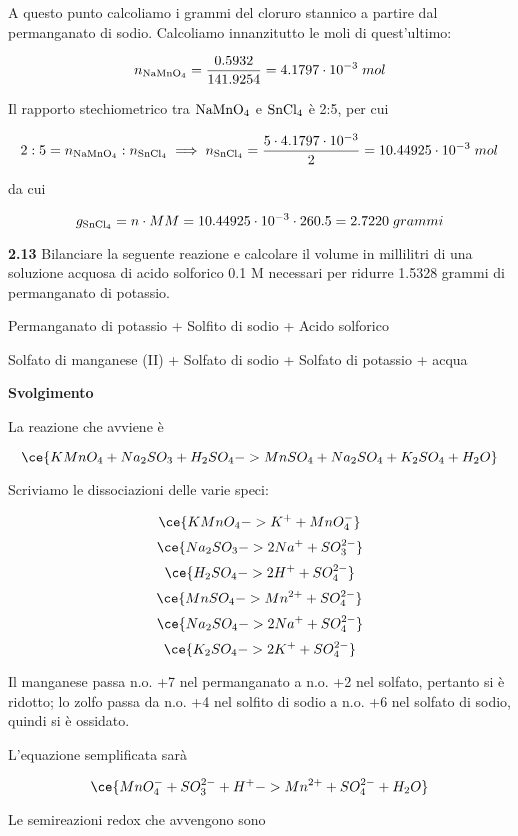 A questo punto calcoliamo i grammi del cloruro stannico a partire dal permanganato di sodio. Calcoliamo innanzitutto le moli di quest'ultimo:

$$n_{\rm NaMnO_4}=\frac{0.5932}{141.9254}
=4.1797 \cdot 10^{-3}\;mol$$

Il rapporto stechiometrico tra $\rm NaMnO_4$ e $\rm SnCl_4$ è 2:5, per cui 

$$2:5=n_{\rm NaMnO_4}:n_{\rm SnCl_4}
\implies
n_{\rm SnCl_4}=\frac{5 \cdot 4.1797 \cdot 10^{-3}}{2}
=10.44925 \cdot 10^{-3}\;mol$$

da cui

$$g_{\rm SnCl_4}=n \cdot MM=10.44925 \cdot 10^{-3} \cdot 260.5=2.7220\;grammi$$

\vspace{0.2cm}\textbf{2.13} Bilanciare la seguente reazione e calcolare il volume in millilitri di una soluzione acquosa di acido solforico 0.1 M necessari per ridurre 1.5328 grammi di permanganato di potassio.

\begin{center}
    Permanganato di potassio + Solfito di sodio + Acido solforico \ce{->}

    \ce{->} Solfato di manganese (II) + Solfato di sodio + Solfato di potassio + acqua
\end{center}

\vspace{0.2cm}\large\textbf{Svolgimento}\normalsize

\vspace{0.2cm}La reazione che avviene è

$$\ce{KMnO_4 + Na_2SO_3 + H_2SO_4 -> MnSO_4 + Na_2SO_4 + K_2SO_4 + H_2O}$$

Scriviamo le dissociazioni delle varie speci:

$$\ce{KMnO_4 -> K^+ + MnO_4^-}$$
$$\ce{Na_2SO_3 -> 2Na^+ + SO_3^{2-}}$$
$$\ce{H_2SO_4 -> 2H^+ + SO_4^{2-}}$$
$$\ce{MnSO_4 -> Mn^{2+} + SO_4^{2-}}$$
$$\ce{Na_2SO_4 -> 2Na^+ + SO_4^{2-}}$$
$$\ce{K_2SO_4 -> 2K^+ + SO_4^{2-}}$$

Il manganese passa n.o. +7 nel permanganato a n.o. +2 nel solfato, pertanto si è ridotto; lo zolfo passa da n.o. +4 nel solfito di sodio a n.o. +6 nel solfato di sodio, quindi si è ossidato.

L'equazione semplificata sarà

$$\ce{MnO_4^- + SO_3^{2-} + H^+ -> Mn^{2+} + SO_4^{2-} + H_2O}$$

Le semireazioni redox che avvengono sono


